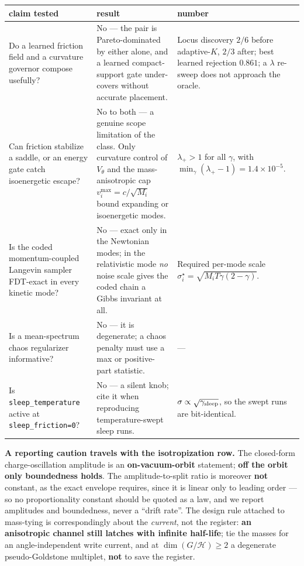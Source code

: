 \documentclass{article}
\begin{document}
\begin{center}
\begin{tabular}{@{}p{1.52in} p{1.52in} p{2.06in}@{}}
\toprule
claim tested & result & number \\
\midrule

Do a learned friction field and a curvature governor compose usefully? &
No --- the pair is Pareto-dominated by either alone, and a learned compact-support gate under-covers without accurate placement. &
Locus discovery $2/6$ before adaptive-$K$, $2/3$ after; best learned rejection $0.861$; a $\lambda$ re-sweep does not approach the oracle. \\[2pt]
Can friction stabilize a saddle, or an energy gate catch isoenergetic escape? &
No to both --- a genuine scope limitation of the class. Only curvature control of $V_\theta$ and the mass-anisotropic cap $v_i^{\max}=c/\sqrt{M_i}$ bound expanding or isoenergetic modes. &
$\lambda_+>1$ for all $\gamma$, with $\min_\gamma(\lambda_+-1)=1.4{\times}10^{-5}$. \\[2pt]
Is the coded momentum-coupled Langevin sampler FDT-exact in every kinetic mode? &
No --- exact only in the Newtonian modes; in the relativistic mode \emph{no} noise scale gives the coded chain a Gibbs invariant at all. &
Required per-mode scale $\sigma^\star_i=\sqrt{M_iT\gamma(2-\gamma)}$. \\[2pt]
Is a mean-spectrum chaos regularizer informative? &
No --- it is degenerate; a chaos penalty must use a max or positive-part statistic. &
--- \\[2pt]
Is \texttt{sleep\_temperature} active at \texttt{sleep\_friction=0}? &
No --- a silent knob; cite it when reproducing temperature-swept sleep runs. &
$\sigma\propto\sqrt{\gamma_{\rm sleep}}$, so the swept runs are bit-identical. \\
\bottomrule
\end{tabular}
\end{center}

\textbf{A reporting caution travels with the isotropization row.} The closed-form charge-oscillation amplitude is an \textbf{on-vacuum-orbit} statement; \textbf{off the orbit only boundedness holds}. The amplitude-to-split ratio is moreover \textbf{not} constant, as the exact envelope requires, since it is linear only to leading order --- so no proportionality constant should be quoted as a law, and we report amplitudes and boundedness, never a ``drift rate''. The design rule attached to mass-tying is correspondingly about the \emph{current}, not the register: \textbf{an anisotropic channel still latches with infinite half-life}; tie the masses for an angle-independent write current, and at $\dim(G/\mathcal H)\ge2$ a degenerate pseudo-Goldstone multiplet, \textbf{not} to save the register.
\end{document}
